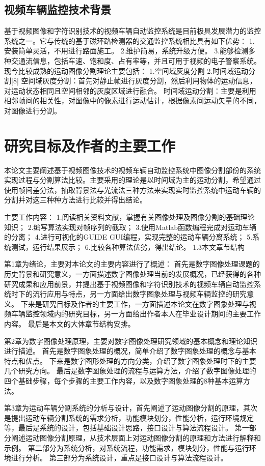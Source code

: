 \documentclass[18pt, twoside, a4paper, dvipdfm]{book}
\begin{document}
\subsection{视频车辆监控技术背景}

基于视频图像和字符识别技术的视频车辆自动监控系统是目前极具发展潜力的监控系统之一。它与传统的基于磁环路检测器的交通监控系统相比具有如下优势：
1.安装简单灵活，不用进行路面施工。
2.维护简易，系统升级方便。
3.能够检测多种交通流信息，包括车速、饱和度、占有率等，并且可用于视频的电子警察系统。
现今比较成熟的运动图像分割理论主要包括：
1.空间域灰度分割
2.时间域运动分割[8]
空间域灰度分割：首先对静止帧进行灰度分割，然后利用物体的运动信息，对运动状态相同且空间相邻的灰度区域进行融合。
时间域运动分割：主要是利用相邻帧间的相关性，对图像中的像素进行运动估计，根据像素间运动矢量的不同，对图像进行分割。

\section{研究目标及作者的主要工作}
本论文主要阐述基于视频图像技术的视频车辆自动监控系统中图像分割部份的系统实现过程与分割算法比较。主要采用的理论是以时间域为主的运动分割，希望通过使用帧间差分法，抽取背景法与光流法三种方法来实现实时监控系统中运动车辆的分割并对这三种种方法进行比较并得出结论。

主要工作内容：
1.阅读相关资料文献，掌握有关图像处理及图像分割的基础理论知识；
2.编写算法实现对帧序列的截取；
3.使用Matlab函数编程完成对运动车辆的分离；
4.进行可视化的GUIDE GUI编程，实现完整的运动车辆分离系统；
5.系统测试，运行结果展示；
6.比较各种算法优劣，得出结论。
1.3本文章节结构

第1章为绪论，主要对本论文的主要内容进行了概述：
首先是数字图像处理课题的历史背景和研究意义，一方面描述数字图像处理当前的发展概况，已经获得的各种研究成果和应用前景，并提出基于视频图像和字符识别技术的视频车辆自动监控系统时下的流行应用与特点，另一方面给出数字图象处理与视频车辆监控的研究意义。
下来是研究目标及作者的主要工作，一方面描述本论文在数字图象处理与视频车辆监控领域内的研究目标，另一方面给出作者本人在毕业设计期间的主要工作内容。
最后是本文的大体章节结构安排。

第2章为数字图像处理原理，主要对数字图像处理研究领域的基本概念和理论知识进行描述。
首先是数字图象处理的概况，简单介绍了数字图象处理的概念与基本特点和优点。
下来是数字图形处理的方向分类，介绍了数字图象处理时下的主要几个研究方向。
最后是数字图象处理的流程与运算方法，介绍了数字图像处理的四个基础步骤，每个步骤的主要工作内容，以及数字图象处理的8种基本运算方法。

第3章为运动车辆分割系统的分析与设计，首先阐述了运动图像分割的原理，其次是提出运动车辆分割系统的需求分析，功能模块划分，性能分析，运行环境规定等，最后是系统的设计，包括基础设计思路，接口设计与算法流程设计。
第一部分阐述运动图像分割原理，从技术层面上对运动图像分割的原理和方法进行解释和示例。
第二部分为系统分析，对系统流程，功能需求，模块划分，性能与运行环境进行分析。
第三部分为系统设计，重点是接口设计与算法流程设计。
\end{document}
